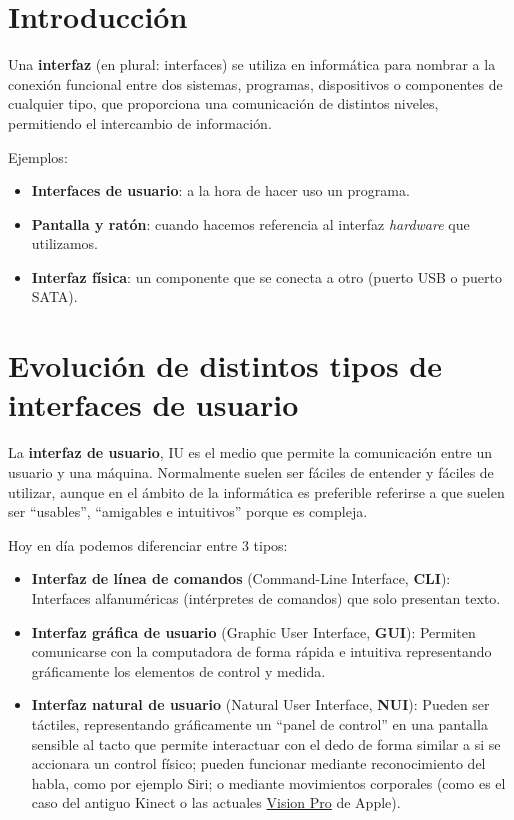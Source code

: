 \chapter{Introducción}


Una \textbf{interfaz} (en plural: interfaces) se utiliza en informática para nombrar a la conexión funcional entre dos sistemas, programas, dispositivos o componentes de cualquier tipo, que proporciona una comunicación de distintos niveles, permitiendo el intercambio de información.

Ejemplos:

\begin{itemize}
    \item \textbf{Interfaces de usuario}: a la hora de hacer uso un programa.
    \item \textbf{Pantalla y ratón}: cuando hacemos referencia al interfaz \textit{hardware} que utilizamos.
    \item \textbf{Interfaz física}: un componente que se conecta a otro (puerto USB o puerto SATA).
\end{itemize}


\chapter{Evolución de distintos tipos de interfaces de usuario}
La \textbf{interfaz de usuario}, IU es el medio que permite la comunicación entre un usuario y una máquina. Normalmente suelen ser fáciles de entender y fáciles de utilizar, aunque en el ámbito de la informática es preferible referirse a que suelen ser “usables”, “amigables e intuitivos” porque es compleja.

Hoy en día podemos diferenciar entre 3 tipos:

\begin{itemize}
    \item \textbf{Interfaz de línea de comandos} (Command-Line Interface, \textbf{CLI}): Interfaces alfanuméricas (intérpretes de comandos) que solo presentan texto.

    \item \textbf{Interfaz gráfica de usuario} (Graphic User Interface, \textbf{GUI}): Permiten comunicarse con la computadora de forma rápida e intuitiva representando gráficamente los elementos de control y medida.

    \item \textbf{Interfaz natural de usuario} (Natural User Interface, \textbf{NUI}): Pueden ser táctiles, representando gráficamente un “panel de control” en una pantalla sensible al tacto que permite interactuar con el dedo de forma similar a si se accionara un control físico; pueden funcionar mediante reconocimiento del habla, como por ejemplo Siri; o mediante movimientos corporales (como es el caso del antiguo Kinect o las actuales \href{https://www.apple.com/apple-vision-pro/}{Vision Pro} de Apple).
\end{itemize}

